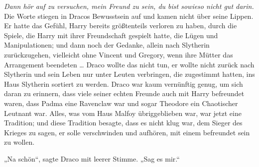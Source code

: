 \emph{Dann hör auf zu versuchen, mein Freund zu sein, du bist sowieso nicht gut darin.}
Die Worte stiegen in Dracos Bewusstsein auf und kamen nicht über seine Lippen. Er hatte das Gefühl, Harry bereits größtenteils verloren zu haben, durch die Spiele, die Harry mit ihrer Freundschaft gespielt hatte, die Lügen und Manipulationen; und dann noch der Gedanke, allein nach Slytherin zurückzugehen, vielleicht ohne Vincent und Gregory, wenn ihre Mütter das Arrangement beendeten … Draco wollte das nicht tun, er wollte nicht zurück nach Slytherin und sein Leben nur unter Leuten verbringen, die zugestimmt hatten, ins Haus Slytherin sortiert zu werden.
Draco war kaum vernünftig genug, um sich daran zu erinnern, dass viele seiner echten Freunde auch mit Harry befreundet waren, dass Padma eine Ravenclaw war und sogar Theodore ein Chaotischer Leutnant war. Alles, was vom Haus Malfoy übriggeblieben war, war jetzt eine Tradition; und diese Tradition besagte, dass es nicht klug war, dem Sieger des Krieges zu sagen, er solle verschwinden und aufhören, mit einem befreundet sein zu wollen.

„Na schön“, sagte Draco mit leerer Stimme.
„Sag es mir.“

